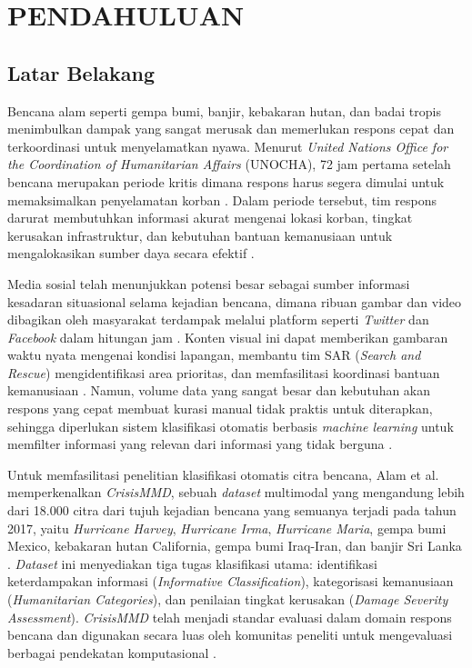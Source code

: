 \newpage
\chapter{PENDAHULUAN} \label{Bab I}

\section{Latar Belakang} \label{I.LatarBelakang}
Bencana alam seperti gempa bumi, banjir, kebakaran hutan, dan badai
tropis menimbulkan dampak yang sangat merusak dan memerlukan respons
cepat dan terkoordinasi untuk menyelamatkan nyawa. Menurut
\textit{United Nations Office for the Coordination of Humanitarian
Affairs} (UNOCHA), 72 jam pertama setelah bencana merupakan periode
kritis dimana respons harus segera dimulai untuk memaksimalkan
penyelamatan korban \cite{unocha2017disaster}. Dalam periode tersebut,
tim respons darurat membutuhkan informasi akurat mengenai lokasi
korban, tingkat kerusakan infrastruktur, dan kebutuhan bantuan
kemanusiaan untuk mengalokasikan sumber daya secara efektif
\cite{braik2024automated}. \par

Media sosial telah menunjukkan potensi besar sebagai sumber informasi
kesadaran situasional selama kejadian bencana, dimana ribuan gambar dan
video dibagikan oleh masyarakat terdampak melalui platform seperti
\textit{Twitter} dan \textit{Facebook} dalam hitungan jam
\cite{seneviratne2024social}. Konten visual ini dapat memberikan
gambaran waktu nyata mengenai kondisi lapangan, membantu tim SAR
(\textit{Search and Rescue}) mengidentifikasi area prioritas, dan
memfasilitasi koordinasi bantuan kemanusiaan \cite{gopal2024leveraging}.
Namun, volume data yang sangat besar dan kebutuhan akan respons yang
cepat membuat kurasi manual tidak praktis untuk diterapkan, sehingga
diperlukan sistem klasifikasi otomatis berbasis \textit{machine
learning} untuk memfilter informasi yang relevan dari informasi yang
tidak berguna \cite{awasthi2023machine}. \par

Untuk memfasilitasi penelitian klasifikasi otomatis citra bencana,
Alam et al. memperkenalkan \textit{CrisisMMD}, sebuah \textit{dataset}
multimodal yang mengandung lebih dari 18.000 citra dari tujuh kejadian
bencana yang semuanya terjadi pada tahun 2017, yaitu \textit{Hurricane
Harvey}, \textit{Hurricane Irma}, \textit{Hurricane Maria}, gempa bumi
Mexico, kebakaran hutan California, gempa bumi Iraq-Iran, dan banjir
Sri Lanka \cite{alam2018crisismmd}. \textit{Dataset} ini menyediakan
tiga tugas klasifikasi utama: identifikasi keterdampakan informasi
(\textit{Informative Classification}), kategorisasi kemanusiaan
(\textit{Humanitarian Categories}), dan penilaian tingkat kerusakan
(\textit{Damage Severity Assessment}). \textit{CrisisMMD} telah menjadi
standar evaluasi dalam domain respons bencana dan digunakan secara luas
oleh komunitas peneliti untuk mengevaluasi berbagai pendekatan
komputasional \cite{firmansyah2022ensemble}. \par

